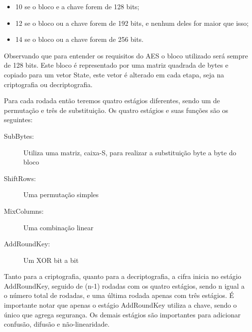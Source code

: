 		\begin{itemize}
		\item 10 se o bloco e a chave forem de 128 bits; 
		\item 12 se o bloco ou a chave forem de 192 bits, e nenhum deles for maior que isso; 
		\item 14 se o bloco ou a chave forem de 256 bits. 
		
		\end{itemize}
	
	Observando que para entender os requisitos do AES o bloco utilizado será sempre de 128 bits. Este bloco é representado por uma matriz quadrada de bytes e copiado para um vetor State, este vetor é alterado em cada etapa, seja na criptografia ou decriptografia. \par
	Para cada rodada então teremos quatro estágios diferentes, sendo um de permutação e três de substituição. Os quatro estágios e suas funções são os seguintes:
	\begin{description}
		\item[SubBytes:] Utiliza uma matriz, caixa-S, para realizar a substituição byte a byte do bloco
		\item[ShiftRows:] Uma permutação simples
		\item[MixColumns:] Uma combinação linear
		\item[AddRoundKey:] Um XOR bit a bit
	\end{description}
	 
		Tanto para a criptografia, quanto para a decriptografia, a cifra inicia no estágio AddRoundKey, seguido de (n-1) rodadas com os quatro estágios, sendo n igual a o número total de rodadas, e uma última rodada apenas com três estágios. É importante notar que apenas o estágio AddRoundKey utiliza a chave, sendo o único que agrega segurança. Os demais estágios são importantes para adicionar confusão, difusão e não-linearidade.
	
